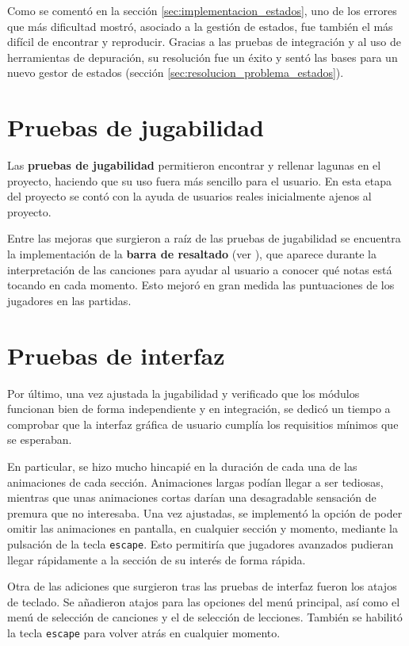 Como se comentó en la sección \ref{sec:implementacion_estados}, uno de los
errores que más dificultad mostró, asociado a la gestión de estados, fue también
el más difícil de encontrar y reproducir. Gracias a las pruebas de integración y
al uso de herramientas de depuración, su resolución fue un éxito y sentó las
bases para un nuevo gestor de estados (sección
\ref{sec:resolucion_problema_estados}).

\section{Pruebas de jugabilidad}
Las \textbf{pruebas de jugabilidad} permitieron encontrar y rellenar lagunas en
el proyecto, haciendo que su uso fuera más sencillo para el usuario. En esta
etapa del proyecto se contó con la ayuda de usuarios reales inicialmente ajenos
al proyecto.

Entre las mejoras que surgieron a raíz de las pruebas de jugabilidad se
encuentra la implementación de la \textbf{barra de resaltado} (ver
\textit{}), que aparece durante la interpretación
de las canciones para ayudar al usuario a conocer qué notas está tocando en cada
momento. Esto mejoró en gran medida las puntuaciones de los jugadores en las
partidas.

\section{Pruebas de interfaz}
Por último, una vez ajustada la jugabilidad y verificado que los módulos
funcionan bien de forma independiente y en integración, se dedicó un tiempo a
comprobar que la interfaz gráfica de usuario cumplía los requisitios mínimos que
se esperaban.

En particular, se hizo mucho hincapié en la duración de cada una de las
animaciones de cada sección. Animaciones largas podían llegar a ser tediosas,
mientras que unas animaciones cortas darían una desagradable sensación de
premura que no interesaba. Una vez ajustadas, se implementó la opción de poder
omitir las animaciones en pantalla, en cualquier sección y momento, mediante la
pulsación de la tecla \texttt{escape}. Esto permitiría que jugadores avanzados
pudieran llegar rápidamente a la sección de su interés de forma rápida.

Otra de las adiciones que surgieron tras las pruebas de interfaz fueron los
atajos de teclado. Se añadieron atajos para las opciones del menú principal, así
como el menú de selección de canciones y el de selección de lecciones. También
se habilitó la tecla \texttt{escape} para volver atrás en cualquier momento.

